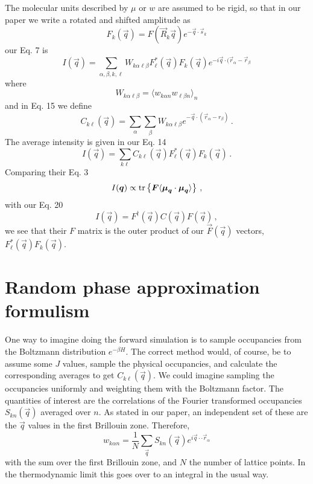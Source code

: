 \documentclass[12pt]{article}
\begin{document}
The molecular units described by $\mu$ or $w$ are
assumed to be rigid, so that in our paper we write a rotated and shifted
amplitude as
\begin{equation}
F_k(\vec q) = F(\vec R_k \vec q) e^{-\vec q\cdot \vec s_k}
\end{equation}
our Eq. 7 is
\begin{equation}
I(\vec q) = \sum_{\alpha,\beta,k,\ell} W_{k\alpha \ell \beta}
F_\ell^*(\vec q) F_k(\vec q) e^{-i\vec q \cdot (\vec r_\alpha-\vec r_\beta}
\end{equation}
where
\begin{equation}
W_{k\alpha \ell \beta} = \langle w_{k\alpha n} w_{\ell\beta n} \rangle_n
\end{equation}
and in Eq. 15 we define
\begin{equation}
C_{k\ell}(\vec q) =\sum_\alpha\sum_\beta W_{k\alpha\ell\beta}
e^{-\vec q \cdot (\vec r_\alpha-r_\beta)} \,.
\end{equation}
The average intensity is given in our Eq. 14
\begin{equation}
I(\vec q) = \sum_{k\ell} C_{k\ell}(\vec q) F^*_\ell(\vec q) F_k(\vec q)
\,.
\end{equation}
Comparing their Eq. 3
\begin{equation}
I(\vec q) \propto {\rm tr}
\left \{ \vec F\langle \vec \mu_{\vec q} \cdot \vec \mu_{\vec q}\rangle \right\}
\,,
\end{equation}
with our Eq. 20
\begin{equation}
I(\vec q) = F^\dagger(\vec q) C(\vec q) F(\vec q) \,,
\end{equation}
we see that their $F$ matrix is the outer
product of our $\vec F(\vec q)$ vectors,
$F^*_\ell(\vec q) F_k(\vec q)$.

\section{Random phase approximation formulism}
One way to imagine doing the forward simulation is to sample
occupancies from the Boltzmann distribution $e^{-\beta H}$. The correct
method would, of course, be to assume some $J$ values,
sample the physical occupancies, and
calculate the corresponding averages to get $C_{k\ell}(\vec q)$.
We could imagine sampling the occupancies uniformly and weighting
them with the Boltzmann factor. The quantities of interest are the
correlations of the Fourier transformed occupancies
$S_{kn}(\vec q)$ averaged over $n$. As stated in our paper,
an independent set of these are the $\vec q$ values in the first Brillouin
zone. Therefore,
\begin{equation}
w_{k\alpha n} = \frac{1}{N} \sum_{\vec q} S_{kn}(\vec q)
e^{i\vec q \cdot\cdot \vec r_\alpha}
\end{equation}
with the sum over the first Brillouin zone, and $N$ the number of lattice
points. In the thermodynamic limit this goes over to an integral in the
usual way.
\end{document}
